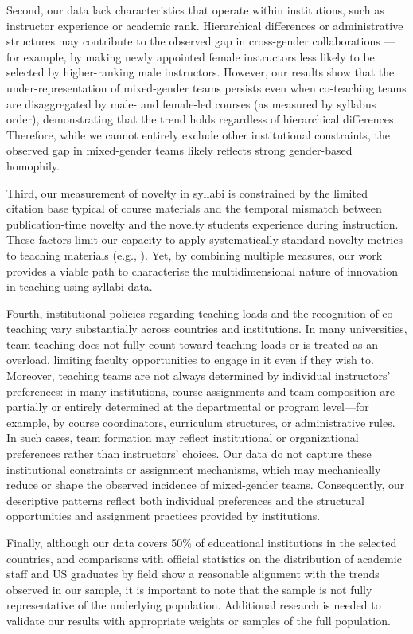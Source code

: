 \documentclass[
  11pt,
]{article}
\begin{document}
Second, our data lack characteristics that operate within institutions, such as instructor experience or academic rank. Hierarchical differences or administrative structures may contribute to the observed gap in cross-gender collaborations --- for example, by making newly appointed female instructors less likely to be selected by higher-ranking male instructors. However, our results show that the under-representation of mixed-gender teams persists even when co-teaching teams are disaggregated by male- and female-led courses (as measured by syllabus order), demonstrating that the trend holds regardless of hierarchical differences. Therefore, while we cannot entirely exclude other institutional constraints, the observed gap in mixed-gender teams likely reflects strong gender-based homophily.

Third, our measurement of novelty in syllabi is constrained by the limited citation base typical of course materials and the temporal mismatch between publication-time novelty and the novelty students experience during instruction. These factors limit our capacity to apply systematically standard novelty metrics to teaching materials (e.g., ). Yet, by combining multiple measures, our work provides a viable path to characterise the multidimensional nature of innovation in teaching using syllabi data.

Fourth, institutional policies regarding teaching loads and the recognition of co-teaching vary substantially across countries and institutions. In many universities, team teaching does not fully count toward teaching loads or is treated as an overload, limiting faculty opportunities to engage in it even if they wish to. Moreover, teaching teams are not always determined by individual instructors' preferences: in many institutions, course assignments and team composition are partially or entirely determined at the departmental or program level---for example, by course coordinators, curriculum structures, or administrative rules. In such cases, team formation may reflect institutional or organizational preferences rather than instructors' choices. Our data do not capture these institutional constraints or assignment mechanisms, which may mechanically reduce or shape the observed incidence of mixed-gender teams. Consequently, our descriptive patterns reflect both individual preferences and the structural opportunities and assignment practices provided by institutions.

Finally, although our data covers 50\% of educational institutions in the selected countries, and comparisons with official statistics on the distribution of academic staff and US graduates by field show a reasonable alignment with the trends observed in our sample, it is important to note that the sample is not fully representative of the underlying population. Additional research is needed to validate our results with appropriate weights or samples of the full population.
\end{document}
